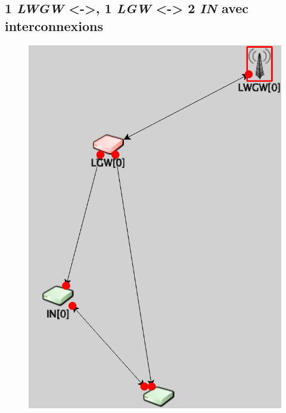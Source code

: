 \documentclass[a4paper]{article}
\begin{document}
\subsection{ 1 \textit{LWGW} <->, 1 \textit{LGW} <-> 2 \textit{IN} avec interconnexions }
\begin{figure}[h!]
\centering
\includegraphics[scale=0.5]{cas_2_1.png} 
\end{figure}

\newpage
\end{document}
